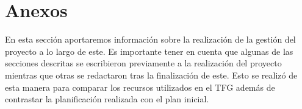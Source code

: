 


\appendix

\chapter{Anexos}
\label{section:Anexos}
En esta sección aportaremos información sobre la realización de la gestión del proyecto a lo largo de este. Es importante tener en cuenta que algunas de las secciones descritas se escribieron previamente a la realización del proyecto mientras que otras se redactaron tras la finalización de este. Esto se realizó de esta manera para comparar los recursos utilizados en el TFG además de contrastar la planificación realizada con el plan inicial.














